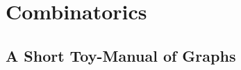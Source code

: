 \documentclass[../../deep-dive]{subfiles}
\begin{document}
\part{Combinatorics}

\chapter{A Short Toy-Manual of Graphs}






\end{document}
